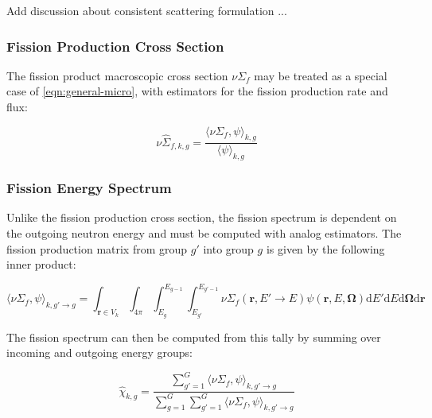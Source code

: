 Add discussion about consistent scattering formulation ...

\subsubsection{Fission Production Cross Section}
\label{subsubsec:tally-types-fiss-prod}

The fission product macroscopic cross section $\nu\Sigma_{f}$ may be treated as a special case of \autoref{eqn:general-micro}, with estimators for the fission production rate and flux:

\begin{equation}
\label{eqn:nu-fiss-macro}
\nu\hat{\Sigma}_{f,k,g} = \frac{\langle \nu\Sigma_{f}, \psi \rangle_{k,g}}{\langle \psi \rangle_{k,g}}
\end{equation}

\subsubsection{Fission Energy Spectrum}
\label{subsubsec:tally-types-chi}

Unlike the fission production cross section, the fission spectrum is dependent on the outgoing neutron energy and must be computed with analog estimators. The fission production matrix from group $g'$ into group $g$ is given by the following inner product:

\begin{equation}
\label{eqn:nu-fiss-energies}
\langle \nu\Sigma_{f}, \psi \rangle_{k,g'\rightarrow g} = \int_{\mathbf{r} \in V_{k}} \int_{4\pi} \int_{E_{g}}^{E_{g-1}} \int_{E_{g'}}^{E_{g'-1}} \nu\Sigma_{f}(\mathbf{r},E'\rightarrow E)\psi(\mathbf{r},E,\mathbf{\Omega}) \mathrm{d}E'\mathrm{d}E\mathrm{d}\mathbf{\Omega}\mathrm{d}\mathbf{r}
\end{equation}

\noindent The fission spectrum can then be computed from this tally by summing over incoming and outgoing energy groups:

\begin{equation}
\label{eqn:chi}
\hat{\chi}_{k,g} = \frac{\displaystyle\sum\limits_{g'=1}^{G} \langle \nu\Sigma_{f}, \psi \rangle_{k,g'\rightarrow g}}{\displaystyle\sum\limits_{g=1}^{G} \displaystyle\sum\limits_{g'=1}^{G} \langle \nu\Sigma_{f}, \psi \rangle_{k,g'\rightarrow g}}
\end{equation}

